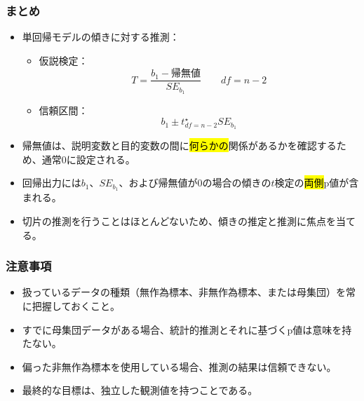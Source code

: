\begin{frame}
\frametitle{まとめ}

\begin{itemize}

\item 単回帰モデルの傾きに対する推測：
\begin{itemize}
\item 仮説検定：
\[ T = \frac{b_1 - \text{帰無値}}{SE_{b_1}} \qquad df = n - 2 \]
\item 信頼区間：
\[ b_1 \pm t^\star_{df = n - 2} SE_{b_1} \]
\end{itemize}

\item 帰無値は、説明変数と目的変数の間に\hl{何らかの}関係があるかを確認するため、通常0に設定される。

\item 回帰出力には$b_1$、$SE_{b_1}$、および帰無値が0の場合の傾きの$t$検定の\hl{両側}p値が含まれる。

\item 切片の推測を行うことはほとんどないため、傾きの推定と推測に焦点を当てる。

\end{itemize}

\end{frame}



\begin{frame}
\frametitle{注意事項}

\begin{itemize}

\item 扱っているデータの種類（無作為標本、非無作為標本、または母集団）を常に把握しておくこと。

\item すでに母集団データがある場合、統計的推測とそれに基づくp値は意味を持たない。

\item 偏った非無作為標本を使用している場合、推測の結果は信頼できない。

\item 最終的な目標は、独立した観測値を持つことである。

\end{itemize}

\end{frame}

